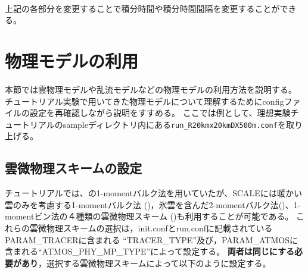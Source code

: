 \\

上記の各部分を変更することで積分時間や積分時間間隔を変更することができる。


\section{物理モデルの利用} \label{sec:adv_physics}
本節では雲物理モデルや乱流モデルなどの物理モデルの利用方法を説明する。
チュートリアル実験で用いてきた物理モデルについて理解するためにconfigファイルの設定を再確認しながら説明をすすめる。
ここでは例として、理想実験チュートリアルのsampleディレクトリ内にある\verb|run_R20kmx20kmDX500m.conf|を取り上げる。


\subsection{雲微物理スキームの設定} \label{sec:adv_microphys}
チュートリアルでは、\cite{tomita_2008}の1-momentバルク法を用いていたが、SCALEには暖かい雲のみを考慮する1-momentバルク法
(\cite{kessler_1969})，氷雲を含んだ2-momentバルク法(\cite{sn_2014})、1-momentビン法の４種類の雲微物理スキーム
(\cite{suzuki_etal_2010})も利用することが可能である。
これらの雲微物理スキームの選択は，init.confとrun.confに記載されているPARAM\_TRACERに含まれる
``TRACER\_TYPE''及び，PARAM\_ATMOSに含まれる``ATMOS\_PHY\_MP\_TYPE''によって設定する。
{\bf 両者は同じにする必要があり}，選択する雲微物理スキームによって以下のように設定する。

